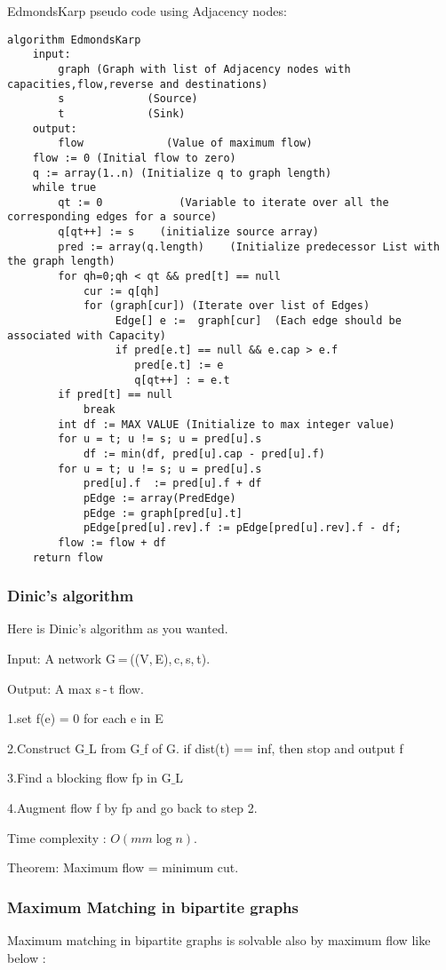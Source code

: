 EdmondsKarp pseudo code using Adjacency nodes:
\begin{verbatim}
algorithm EdmondsKarp
    input:
        graph (Graph with list of Adjacency nodes with capacities,flow,reverse and destinations)
        s             (Source)
        t             (Sink)
    output:
        flow             (Value of maximum flow)
    flow := 0 (Initial flow to zero)
    q := array(1..n) (Initialize q to graph length)
    while true
        qt := 0            (Variable to iterate over all the corresponding edges for a source)
        q[qt++] := s    (initialize source array)
        pred := array(q.length)    (Initialize predecessor List with the graph length)
        for qh=0;qh < qt && pred[t] == null
            cur := q[qh]
            for (graph[cur]) (Iterate over list of Edges)
                 Edge[] e :=  graph[cur]  (Each edge should be associated with Capacity)
                 if pred[e.t] == null && e.cap > e.f
                    pred[e.t] := e
                    q[qt++] : = e.t
        if pred[t] == null
            break
        int df := MAX VALUE (Initialize to max integer value)
        for u = t; u != s; u = pred[u].s
            df := min(df, pred[u].cap - pred[u].f)
        for u = t; u != s; u = pred[u].s
            pred[u].f  := pred[u].f + df
            pEdge := array(PredEdge)
            pEdge := graph[pred[u].t]
            pEdge[pred[u].rev].f := pEdge[pred[u].rev].f - df;
        flow := flow + df
    return flow
\end{verbatim}
\subsubsection{Dinic's algorithm}
Here is Dinic's algorithm as you wanted.

Input: A network G = ((V, E), c, s, t).

Output: A max s - t flow.

1.set f(e) = 0 for each e in E

2.Construct G$\_$L from G$\_$f of G. if dist(t) == inf, then stop and output f 

3.Find a blocking flow fp in G$\_$L

4.Augment flow f by fp  and go back to step 2.

Time complexity : $O(mm\log{n})$.

Theorem: Maximum flow = minimum cut.

\subsubsection{Maximum Matching in bipartite graphs}
Maximum matching in bipartite graphs is solvable also by maximum flow like below :

